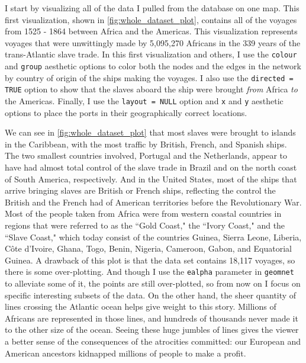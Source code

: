 \documentclass[DIV=calc, paper=a4, fontsize=10pt, twocolumn]{scrartcl}\usepackage[]{graphicx}\usepackage[]{color}
\begin{document}
I start by visualizing all of the data I pulled from the database on one map. This first visualization, shown in \autoref{fig:whole_dataset_plot}, contains all of the voyages from 1525 - 1864 between Africa and the Americas. This visualization represents voyages that were unwittingly made by 5,095,270 Africans in the 339 years of the trans-Atlantic slave trade. In this first visualization and others, I use the \texttt{colour} and \texttt{group} aesthetic options to color both the nodes and the edges in the network by country of origin of the ships making the voyages. I also use the \texttt{directed = TRUE} option to show that the slaves aboard the ship were brought \emph{from} Africa \emph{to} the Americas. Finally, I use the \texttt{layout = NULL} option and \texttt{x} and \texttt{y} aesthetic options to place the ports in their geographically correct locations. 

\par We can see in \autoref{fig:whole_dataset_plot} that most slaves were brought to islands in the Caribbean, with the most traffic by British, French, and Spanish ships. The two smallest countries involved, Portugal and the Netherlands, appear to have had almost total control of the slave trade in Brazil and on the north coast of South America, respectively. And in the United States, most of the ships that arrive bringing slaves are British or French ships, reflecting the control the British and the French had of American territories before the Revolutionary War. Most of the people taken from Africa were from western coastal countries in regions that were referred to as the ``Gold Coast," the ``Ivory Coast," and the ``Slave Coast," which today consist of the countries Guinea, Sierra Leone, Liberia, C\^{o}te d'Ivoire, Ghana, Togo, Benin, Nigeria, Cameroon, Gabon, and Equatorial Guinea.  A drawback of this plot is that the data set contains 18,117 voyages, so there is some over-plotting. And though I use the \texttt{ealpha} parameter in \texttt{geomnet} to alleviate some of it, the points are still over-plotted, so from now on I focus on specific interesting subsets of the data. On the other hand, the sheer quantity of lines crossing the Atlantic ocean helps give weight to this story. Millions of Africans are represented in those lines, and hundreds of thousands never made it to the other size of the ocean. Seeing these huge jumbles of lines gives the viewer a better sense of the consequences of the atrocities committed: our European and American ancestors kidnapped millions of people to make a profit.  
\end{document}
